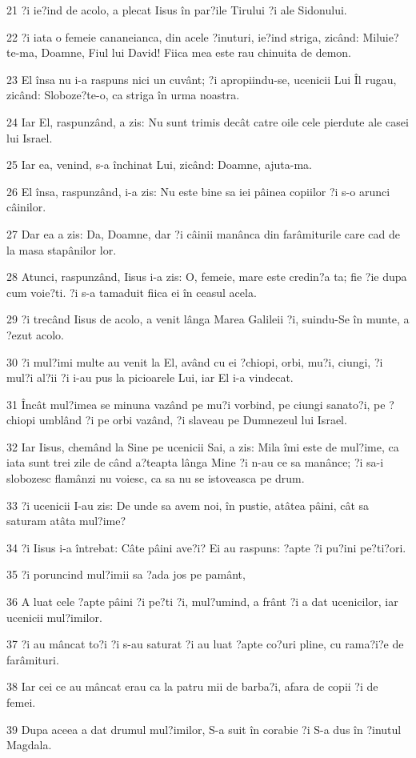 \par 21 ?i ie?ind de acolo, a plecat Iisus în par?ile Tirului ?i ale Sidonului.
\par 22 ?i iata o femeie cananeianca, din acele ?inuturi, ie?ind striga, zicând: Miluie?te-ma, Doamne, Fiul lui David! Fiica mea este rau chinuita de demon.
\par 23 El însa nu i-a raspuns nici un cuvânt; ?i apropiindu-se, ucenicii Lui Îl rugau, zicând: Sloboze?te-o, ca striga în urma noastra.
\par 24 Iar El, raspunzând, a zis: Nu sunt trimis decât catre oile cele pierdute ale casei lui Israel.
\par 25 Iar ea, venind, s-a închinat Lui, zicând: Doamne, ajuta-ma.
\par 26 El însa, raspunzând, i-a zis: Nu este bine sa iei pâinea copiilor ?i s-o arunci câinilor.
\par 27 Dar ea a zis: Da, Doamne, dar ?i câinii manânca din farâmiturile care cad de la masa stapânilor lor.
\par 28 Atunci, raspunzând, Iisus i-a zis: O, femeie, mare este credin?a ta; fie ?ie dupa cum voie?ti. ?i s-a tamaduit fiica ei în ceasul acela.
\par 29 ?i trecând Iisus de acolo, a venit lânga Marea Galileii ?i, suindu-Se în munte, a ?ezut acolo.
\par 30 ?i mul?imi multe au venit la El, având cu ei ?chiopi, orbi, mu?i, ciungi, ?i mul?i al?ii ?i i-au pus la picioarele Lui, iar El i-a vindecat.
\par 31 Încât mul?imea se minuna vazând pe mu?i vorbind, pe ciungi sanato?i, pe ?chiopi umblând ?i pe orbi vazând, ?i slaveau pe Dumnezeul lui Israel.
\par 32 Iar Iisus, chemând la Sine pe ucenicii Sai, a zis: Mila îmi este de mul?ime, ca iata sunt trei zile de când a?teapta lânga Mine ?i n-au ce sa manânce; ?i sa-i slobozesc flamânzi nu voiesc, ca sa nu se istoveasca pe drum.
\par 33 ?i ucenicii I-au zis: De unde sa avem noi, în pustie, atâtea pâini, cât sa saturam atâta mul?ime?
\par 34 ?i Iisus i-a întrebat: Câte pâini ave?i? Ei au raspuns: ?apte ?i pu?ini pe?ti?ori.
\par 35 ?i poruncind mul?imii sa ?ada jos pe pamânt,
\par 36 A luat cele ?apte pâini ?i pe?ti ?i, mul?umind, a frânt ?i a dat ucenicilor, iar ucenicii mul?imilor.
\par 37 ?i au mâncat to?i ?i s-au saturat ?i au luat ?apte co?uri pline, cu rama?i?e de farâmituri.
\par 38 Iar cei ce au mâncat erau ca la patru mii de barba?i, afara de copii ?i de femei.
\par 39 Dupa aceea a dat drumul mul?imilor, S-a suit în corabie ?i S-a dus în ?inutul Magdala.

